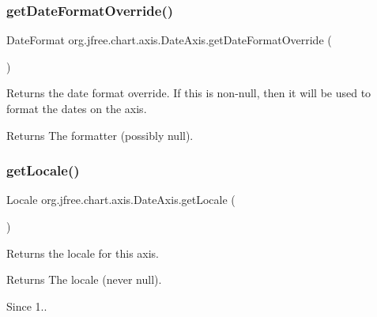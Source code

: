 \subsubsection{\texorpdfstring{get\+Date\+Format\+Override()}{getDateFormatOverride()}}
{\footnotesize\ttfamily Date\+Format org.\+jfree.\+chart.\+axis.\+Date\+Axis.\+get\+Date\+Format\+Override (\begin{DoxyParamCaption}{ }\end{DoxyParamCaption})}

Returns the date format override. If this is non-\/null, then it will be used to format the dates on the axis.

\begin{DoxyReturn}{Returns}
The formatter (possibly {\ttfamily null}). 
\end{DoxyReturn}
\mbox{\label{classorg_1_1jfree_1_1chart_1_1axis_1_1_date_axis_a3ffd10d498c2d070d5cab66b24d5bb0c}} 
\subsubsection{\texorpdfstring{get\+Locale()}{getLocale()}}
{\footnotesize\ttfamily Locale org.\+jfree.\+chart.\+axis.\+Date\+Axis.\+get\+Locale (\begin{DoxyParamCaption}{ }\end{DoxyParamCaption})}

Returns the locale for this axis.

\begin{DoxyReturn}{Returns}
The locale (never {\ttfamily null}).
\end{DoxyReturn}
\begin{DoxySince}{Since}
1.. 
\end{DoxySince}
\mbox{\label{classorg_1_1jfree_1_1chart_1_1axis_1_1_date_axis_a7459e23be2ccb30ff4be922caf3d579b}} 
